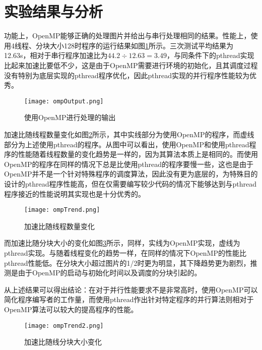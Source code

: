 \section{实验结果与分析}
\par 功能上，OpenMP能够正确的处理图片并给出与串行处理相同的结果。性能上，使用4线程、分块大小128时程序的运行结果如图\ref{fig:ompOutput}所示。三次测试平均结果为12.63s，相对于串行程序加速比为\(44.2\div 12.63 = 3.49\)，与同条件下的pthread实现比起来加速比要低不少，这是由于OpenMP需要进行环境的初始化，且其调度过程没有特别为底层实现的pthread程序优化，因此pthread实现的并行程序性能较为优秀。
\begin{figure}[htpb]
    \centering
    \texttt{[image: ompOutput.png]}
    \caption{使用OpenMP进行处理的输出}
    \label{fig:ompOutput}
\end{figure}

\par 加速比随线程数量变化如图\ref{fig:ompTrend}所示，其中实线部分为使用OpenMP的程序，而虚线部分为上述使用pthread的程序。从图中可以看出，使用OpenMP和使用pthread程序的性能随着线程数量的变化趋势是一样的，因为其算法本质上是相同的。而使用OpenMP的程序在同样的情况下总是比使用pthread的程序要慢一些，这也是由于OpenMP并不是一个针对特殊程序的调度算法，因此没有更为底层的，为特殊目的设计的pthread程序性能高，但在仅需要编写较少代码的情况下能够达到与pthread程序接近的性能说明其实现也是十分优秀的。
\begin{figure}[htpb]
    \centering
    \texttt{[image: ompTrend.png]}
    \caption{加速比随线程数量变化}
    \label{fig:ompTrend}
\end{figure}
\par 而加速比随分块大小的变化如图\ref{fig:ompTrend2}所示，同样，实线为OpenMP实现，虚线为pthread实现。与随着线程变化的趋势一样，在同样的情况下OpenMP的性能比pthread性能低。在分块大小超过图片的1/2时更为明显，其下降趋势更为剧烈，推测是由于OpenMP的启动与初始化时间以及调度的分块引起的。
\par 从上述结果可以得出结论：在对于并行性能要求不是非常高时，使用OpenMP可以简化程序编写者的工作量，而使用pthread作出针对特定程序的并行算法则相对于OpenMP算法可以较大的提高程序的性能。
\begin{figure}[htpb]
    \centering
    \texttt{[image: ompTrend2.png]}
    \caption{加速比随线分块大小变化}
    \label{fig:ompTrend2}
\end{figure}


